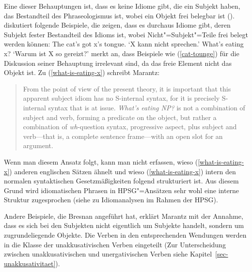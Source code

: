 %
Eine dieser Behauptungen ist, dass es keine Idiome gibt, die ein Subjekt haben, das Bestandteil des
Phraseologismus ist, wobei ein Objekt frei belegbar ist (\citealp[--51]{Marantz81a-u}).
\citet[--350]{Bresnan82c} diskutiert folgende Beispiele, die zeigen, dass es durchaus
Idiome gibt, deren Subjekt fester Bestandteil des Idioms ist, wobei Nicht"=Subjekt"=Teile
frei belegt werden können:
\eal
\ex\label{cat-tounge}
The cat's got x's tongue.
\glt `X kann nicht sprechen.'
\ex\label{what-is-eating-x}
What's eating x?
\glt `Warum ist X so gereizt?'
\zl
\citet[]{Marantz84a} merkt an, dass Beispiele wie (\ref{cat-tounge}) für die Diskussion seiner
Behauptung irrelevant sind, da das freie Element nicht das Objekt ist. Zu (\ref{what-is-eating-x}) schreibt
Marantz:
\begin{quote}
From the point of view of the present theory, it is important that this apparent subject idiom
has no S-internal syntax, for it is precisely S-internal syntax that is at issue. \emph{What's eating NP?}
is not a combination of subject and verb, forming a predicate on the object, but rather a combination of \emph{wh}-question
syntax, progressive aspect, plus subject and verb---that is, a complete sentence frame---with an open slot
for an argument. \citep[]{Marantz84a}
\end{quote}
Wenn man diesem Ansatz folgt, kann man nicht erfassen, wieso (\ref{what-is-eating-x}) anderen englischen
Sätzen ähnelt und wieso (\ref{what-is-eating-x}) intern den normalen syntaktischen Gesetzmäßigkeiten folgend strukturiert ist.
Aus diesem Grund wird idiomatischen Phrasen in HPSG"=Ansätzen sehr wohl eine interne Struktur zugesprochen 
(siehe  zu Idiomanalysen im Rahmen der HPSG). 

Andere Beispiele, die Bresnan angeführt hat, erklärt Marantz mit der Annahme, dass es sich bei
den Subjekten nicht eigentlich um Subjekte handelt, sondern um zugrundeliegende Objekte. Die
Verben in den entsprechenden Wendungen werden in die Klasse der unakkusativischen Verben eingeteilt
(Zur Unterscheidung zwischen unakkusativischen und unergativischen Verben siehe Kapitel~\ref{sec-unakkusativitaet}).

